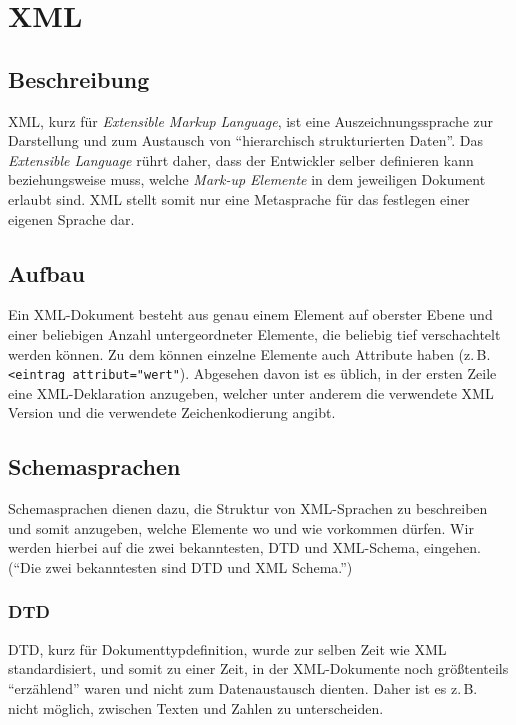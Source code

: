 \chapter{XML}
\section{Beschreibung}
XML, kurz für {\em Extensible Markup Language}, ist eine
Auszeichnungssprache zur Darstellung und zum Austausch von
\enquote{hierarchisch strukturierten Daten}\cite{wiki:de:xml}. Das
{\em Extensible Language} rührt daher, dass der Entwickler selber
definieren kann beziehungsweise muss, welche {\em Mark-up Elemente} in
dem jeweiligen Dokument erlaubt sind. XML stellt somit nur eine
Metasprache für das festlegen einer eigenen Sprache dar.

\section{Aufbau}


Ein XML-Dokument besteht aus genau einem Element auf oberster Ebene
und einer beliebigen Anzahl untergeordneter Elemente, die beliebig
tief verschachtelt werden können. Zu dem können einzelne Elemente auch
Attribute haben (z.\,B. \lstinline{<eintrag attribut="wert"}).
Abgesehen davon ist es üblich, in der ersten Zeile eine
XML-Deklaration anzugeben, welcher unter anderem die verwendete XML
Version und die verwendete Zeichenkodierung angibt.
\newpage
\section{Schemasprachen}
Schemasprachen dienen dazu, die Struktur von XML-Sprachen zu
beschreiben und somit anzugeben, welche Elemente wo und wie vorkommen
dürfen. Wir werden hierbei auf die zwei bekanntesten, DTD und XML-Schema, eingehen.
(\enquote{Die zwei bekanntesten sind DTD und XML Schema.}\cite{wiki:de:xml})
\subsection{DTD}
DTD, kurz für Dokumenttypdefinition, wurde zur selben Zeit wie XML
standardisiert, und somit zu einer Zeit, in der XML-Dokumente noch
größtenteils "`erzählend"' waren und nicht zum Datenaustausch dienten.
Daher ist es z.\,B. nicht möglich, zwischen Texten und Zahlen zu
unterscheiden.

